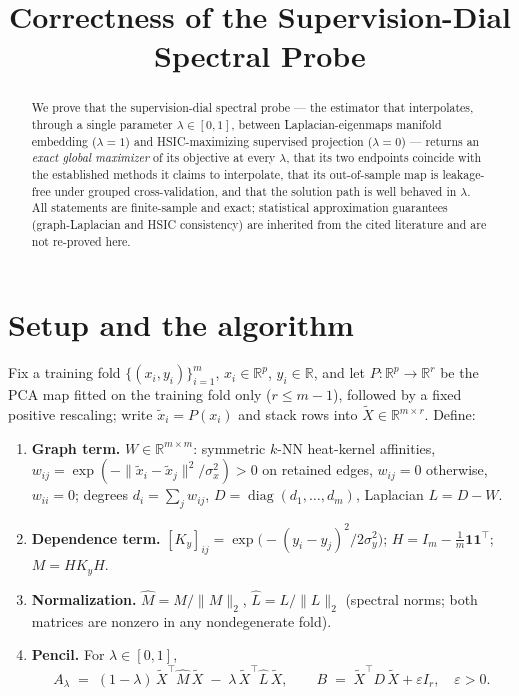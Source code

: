 \documentclass[11pt]{article}
\title{Correctness of the Supervision-Dial Spectral Probe}
\author{}
\date{}
\theoremstyle{remark}
\newcommand{\R}{\mathbb{R}}
\newcommand{\diag}{\operatorname{diag}}
\newcommand{\Xt}{\widetilde{X}}
\newcommand{\Mh}{\widehat{M}}
\newcommand{\Lh}{\widehat{L}}
\begin{document}
\maketitle

\begin{abstract}
\noindent We prove that the supervision-dial spectral probe --- the estimator that
interpolates, through a single parameter $\lambda\in[0,1]$, between Laplacian-eigenmaps
manifold embedding ($\lambda=1$) and HSIC-maximizing supervised projection
($\lambda=0$) --- returns an \emph{exact global maximizer} of its objective at every
$\lambda$, that its two endpoints coincide with the established methods it claims to
interpolate, that its out-of-sample map is leakage-free under grouped cross-validation,
and that the solution path is well behaved in $\lambda$. All statements are
finite-sample and exact; statistical approximation guarantees (graph-Laplacian and HSIC
consistency) are inherited from the cited literature and are not re-proved here.
\end{abstract}

\section{Setup and the algorithm}

Fix a training fold $\{(x_i,y_i)\}_{i=1}^{m}$, $x_i\in\R^{p}$, $y_i\in\R$, and let
$P:\R^{p}\to\R^{r}$ be the PCA map fitted on the training fold only ($r\le m-1$),
followed by a fixed positive rescaling; write $\tilde x_i = P(x_i)$ and stack rows into
$\Xt\in\R^{m\times r}$. Define:

\begin{enumerate}
\item \textbf{Graph term.} $W\in\R^{m\times m}$: symmetric $k$-NN heat-kernel
  affinities, $w_{ij}=\exp(-\|\tilde x_i-\tilde x_j\|^2/\sigma_x^2)>0$ on retained
  edges, $w_{ij}=0$ otherwise, $w_{ii}=0$; degrees $d_i=\sum_j w_{ij}$,
  $D=\diag(d_1,\dots,d_m)$, Laplacian $L=D-W$.
\item \textbf{Dependence term.} $[K_y]_{ij}=\exp\!\big(-(y_i-y_j)^2/2\sigma_y^2\big)$;
  $H=I_m-\tfrac1m\mathbf{1}\mathbf{1}^{\!\top}$; $M=HK_yH$.
\item \textbf{Normalization.} $\Mh=M/\|M\|_2$, $\Lh=L/\|L\|_2$ (spectral norms;
  both matrices are nonzero in any nondegenerate fold).
\item \textbf{Pencil.} For $\lambda\in[0,1]$,
  \[
  A_\lambda \;=\; (1-\lambda)\,\Xt^{\!\top}\Mh\,\Xt \;-\; \lambda\,\Xt^{\!\top}\Lh\,\Xt,
  \qquad
  B \;=\; \Xt^{\!\top} D\,\Xt + \varepsilon I_r,\quad \varepsilon>0 .
  \]
\end{enumerate}
\end{document}
